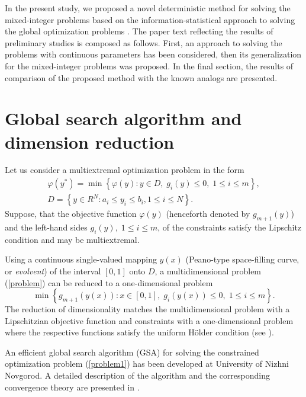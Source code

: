 \documentclass{llncs}
\begin{document}
In the present study, we proposed a novel deterministic method for solving the mixed-integer 
problems based on the information-statistical approach to solving the global optimization 
problems \cite{Strongin2000,Strongin2013}. The paper text reflecting the results of preliminary 
studies is composed as follows. First, an approach to solving the problems with continuous 
parameters has been considered, then its generalization for the mixed-integer problems was 
proposed. In the final section, the results of comparison of the proposed method with the 
known analogs are presented.

\section{Global search algorithm and dimension reduction}

Let us consider a multiextremal optimization problem in the form
\begin{gather}\label{problem}
\varphi(y^\ast)=\min{\left\{\varphi(y):y\in D, \; g_i(y)\leq 0, \; 1 \leq i \leq m\right\}},\\
D=\left\{y\in R^N: a_i\leq y_i \leq b_i, 1\leq i \leq N\right\}.\nonumber
\end{gather}
Suppose, that the objective function $\varphi(y)$ (henceforth denoted by $g_{m+1}(y)$) and
the left-hand sides $g_i(y), \; 1\leq i \leq m$, of the constraints satisfy the Lipschitz condition
and may be multiextremal.

Using a continuous single-valued mapping $y(x)$  (Peano-type space-filling curve, or \textit{evolvent}) of the interval $[0,1]$ onto $D$, a multidimensional problem (\ref{problem}) can be reduced to a one-dimensional problem
\begin{equation}\label{problem1}
\min \left\{g_{m+1}(y(x)): x \in [0,1], \; g_i(y(x))\leq 0, \; 1 \leq i \leq m\right\}.
\end{equation}
The reduction of dimensionality matches the multidimensional problem with a Lipschitzian objective function and constraints with a one-dimensional problem where the respective functions satisfy the uniform H\"older condition (see \cite{Strongin2000}).

An efficient global search algorithm (GSA) for solving the constrained optimization problem 
(\ref{problem1}) has been developed at University of Nizhni Novgorod. A detailed description 
of the algorithm and the corresponding convergence theory are presented in 
\cite{Strongin2000}.
\end{document}
